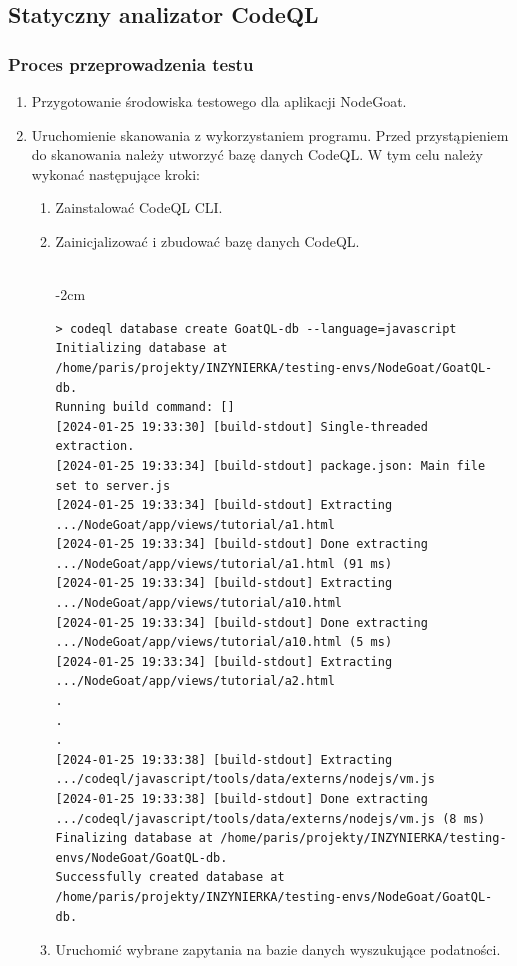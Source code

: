 \normalsize
\subsection{Statyczny analizator CodeQL}\label{subsec:codeql}

\subsubsection{Proces przeprowadzenia testu}

\begin{enumerate}
    \item Przygotowanie środowiska testowego dla aplikacji NodeGoat.
    
    

    \item Uruchomienie skanowania z wykorzystaniem programu.
    Przed przystąpieniem do skanowania należy utworzyć bazę danych CodeQL. W tym celu należy wykonać następujące kroki:
    \begin{enumerate}
        \item Zainstalować CodeQL CLI.
        \item Zainicjalizować i zbudować bazę danych CodeQL. \\\\
        \scriptsize
        \begin{adjustwidth}
        {-2cm}{}
        \begin{verbatim}
> codeql database create GoatQL-db --language=javascript  
Initializing database at /home/paris/projekty/INZYNIERKA/testing-envs/NodeGoat/GoatQL-db.
Running build command: []
[2024-01-25 19:33:30] [build-stdout] Single-threaded extraction.
[2024-01-25 19:33:34] [build-stdout] package.json: Main file set to server.js
[2024-01-25 19:33:34] [build-stdout] Extracting .../NodeGoat/app/views/tutorial/a1.html
[2024-01-25 19:33:34] [build-stdout] Done extracting .../NodeGoat/app/views/tutorial/a1.html (91 ms)
[2024-01-25 19:33:34] [build-stdout] Extracting .../NodeGoat/app/views/tutorial/a10.html
[2024-01-25 19:33:34] [build-stdout] Done extracting .../NodeGoat/app/views/tutorial/a10.html (5 ms)
[2024-01-25 19:33:34] [build-stdout] Extracting .../NodeGoat/app/views/tutorial/a2.html
.
.
.
[2024-01-25 19:33:38] [build-stdout] Extracting .../codeql/javascript/tools/data/externs/nodejs/vm.js
[2024-01-25 19:33:38] [build-stdout] Done extracting .../codeql/javascript/tools/data/externs/nodejs/vm.js (8 ms)
Finalizing database at /home/paris/projekty/INZYNIERKA/testing-envs/NodeGoat/GoatQL-db.
Successfully created database at /home/paris/projekty/INZYNIERKA/testing-envs/NodeGoat/GoatQL-db.
        \end{verbatim}
      \end{adjustwidth}
        \normalsize
        \item Uruchomić wybrane zapytania na bazie danych wyszukujące podatności.
        

\end{enumerate}
\end{enumerate}
